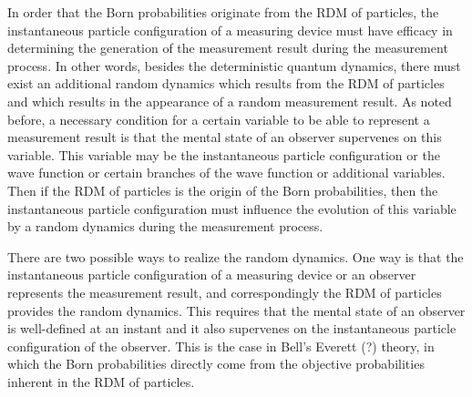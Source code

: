 In order that the Born probabilities originate from the RDM of particles, the instantaneous particle configuration of a measuring device must have efficacy in determining the generation of the measurement result during the measurement process. 
In other words, besides the deterministic quantum dynamics,
there must exist an additional random dynamics which results from the RDM of particles and which results in the appearance of a random measurement result.
As noted before, a necessary condition for a certain variable to be able to represent a measurement result is that the mental state of an observer supervenes on this variable.
This variable may be the instantaneous particle configuration or the wave function or certain branches of the wave function or additional variables.
Then if the RDM of particles is the origin of the Born probabilities, then the instantaneous particle configuration must influence the evolution of this variable by a random dynamics during the measurement process.

There are two possible ways to realize the random dynamics. One way is that the instantaneous particle configuration of a measuring device or an observer represents the measurement result, and correspondingly the RDM of particles  provides the random dynamics.
This requires that the mental state of an observer is well-defined at an instant and it also supervenes on the instantaneous particle configuration of the observer. %
This is the case in Bell's Everett (?) theory, in which the Born probabilities directly come from the objective probabilities inherent in the RDM of particles.


